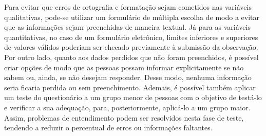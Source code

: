 \documentclass[10pt,a4paper,oneside]{article}
\begin{document}
Para evitar que erros de ortografia e formatação sejam cometidos nas variáveis qualitativas, pode-se utilizar um formulário de múltipla escolha de modo a evitar que as informações sejam preenchidas de maneira textual. Já para as variáveis quantitativas, no caso de um formulário eletrônico, limites inferiores e superiores de valores válidos poderiam ser checado previamente à submissão da observação. Por outro lado, quanto aos dados perdidos que não foram preenchidos, é possível criar opções de modo que as pessoas possam informar explicitamente se não sabem ou, ainda, se não desejam responder. Desse modo, nenhuma informação seria ficaria perdida ou sem preenchimento. Ademais, é possível também aplicar um teste do questionário a um grupo menor de pessoas com o objetivo de testá-lo e verificar a sua adequação, para, posteriormente, aplicá-lo a um grupo maior. Assim, problemas de entendimento podem ser resolvidos nesta fase de teste, tendendo a reduzir o percentual de erros ou informações faltantes.
\end{document}
